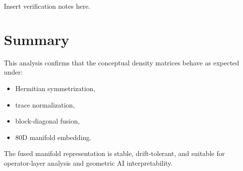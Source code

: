 \documentclass[11pt]{article}
\begin{document}
Insert verification notes here.

\section{Summary}

This analysis confirms that the conceptual density matrices behave as expected under:

\begin{itemize}
    \item Hermitian symmetrization,
    \item trace normalization,
    \item block-diagonal fusion,
    \item 80D manifold embedding.
\end{itemize}

The fused manifold representation is stable, drift-tolerant, and suitable for
operator-layer analysis and geometric AI interpretability.
\end{document}
